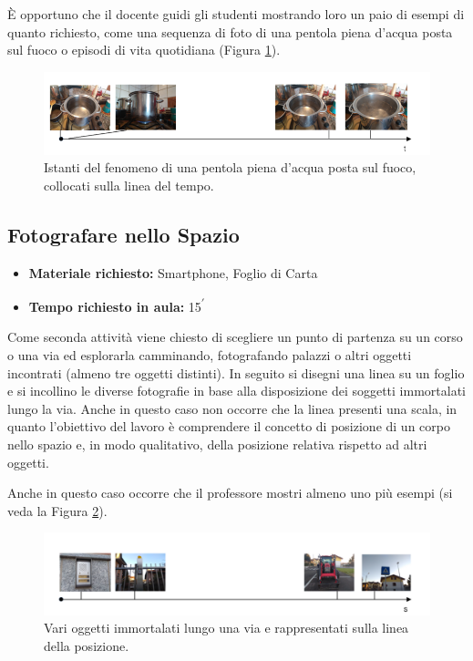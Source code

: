 \documentclass{report} \usepackage[T1]{fontenc} \usepackage[italian]{babel}
\begin{document}
\`E opportuno che il docente guidi gli studenti mostrando loro un paio di esempi
di quanto richiesto, come una sequenza di foto di una pentola piena d’acqua
posta sul fuoco o episodi di vita quotidiana (Figura \ref{fig:asse_t_pentola}).
\begin{figure}[H]
\centering
  \includegraphics[width=\textwidth]{asse_t_pentola}
  \caption{Istanti del fenomeno di una pentola piena d'acqua posta sul fuoco,
           collocati sulla linea del tempo.}
  \label{fig:asse_t_pentola}
\end{figure}

\subsection{Fotografare nello Spazio}

\begin{itemize}
\item \textbf{Materiale richiesto:} Smartphone, Foglio di Carta
\item \textbf{Tempo richiesto in aula:} 15\textsuperscript{$\prime$}
\end{itemize}

Come seconda attività viene chiesto di scegliere un punto di partenza su un
corso o una via ed esplorarla camminando, fotografando palazzi o altri oggetti
incontrati (almeno tre oggetti distinti). In seguito si disegni una linea su un
foglio e si incollino le diverse fotografie in base alla disposizione dei
soggetti immortalati lungo la via. Anche in questo caso non occorre che la
linea presenti una scala, in quanto l’obiettivo del lavoro è comprendere il
concetto di posizione di un corpo nello spazio e, in modo qualitativo, della
posizione relativa rispetto ad altri oggetti.

Anche in questo caso occorre che il professore mostri almeno uno più esempi
(si veda la Figura \ref{fig:asse_s}).
\begin{figure}[H]
\centering
  \includegraphics[width=\textwidth]{asse_s}
  \caption{Vari oggetti immortalati lungo una via e rappresentati
           sulla linea della posizione.}
  \label{fig:asse_s}
\end{figure}
\end{document}
